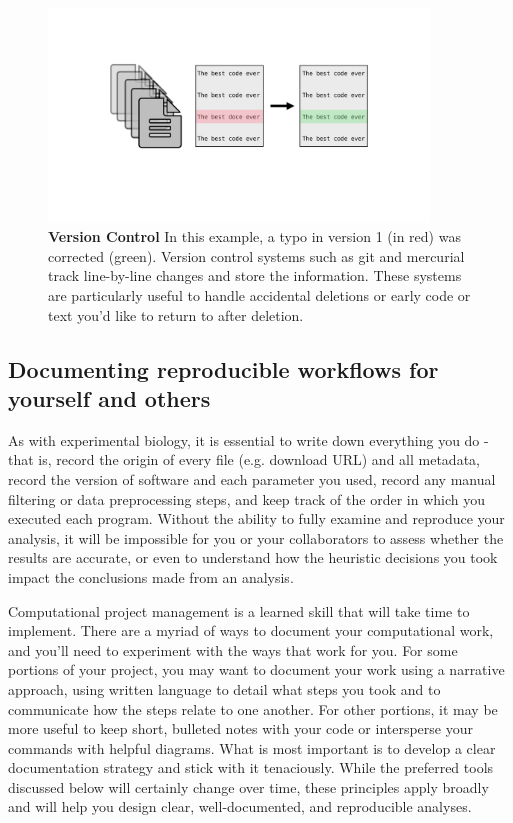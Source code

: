 \documentclass[10pt,letterpaper]{article}
\begin{document}
\begin{figure}
\includegraphics[width=0.9\textwidth]{figures/version_control.pdf}
\caption{ 
\textbf{Version Control} In this example, a typo in version 1 (in red) was corrected (green). Version control systems such as git and mercurial track line-by-line changes and store the information. These systems are particularly useful to handle accidental deletions or early code or text you'd like to return to after deletion.
}
\label{fig:version_control}
\end{figure}


\subsection*{Documenting reproducible workflows for yourself and others}

As with experimental biology, it is essential to write down everything you do - that is, record the origin of every file (e.g. download URL) and all metadata, record the version of software and each parameter you used, record any manual filtering or data preprocessing steps, and keep track of the order in which you executed each program. 
Without the ability to fully examine and reproduce your analysis, it will be impossible for you or your collaborators to assess whether the results are accurate, or even to understand how the heuristic decisions you took impact the conclusions made from an analysis. 

Computational project management is a learned skill that will take time to implement. There are a myriad of ways to document your computational work, and you'll need to experiment with the ways that work for you. 
For some portions of your project, you may want to document your work using a narrative approach, using written language to detail what steps you took and to communicate how the steps relate to one another. 
For other portions, it may be more useful to keep short, bulleted notes with your code or intersperse your commands with helpful diagrams. 
What is most important is to develop a clear documentation strategy and stick with it tenaciously. 
While the preferred tools discussed below will certainly change over time, these principles apply broadly and will help you design clear, well-documented, and reproducible analyses.
\end{document}
